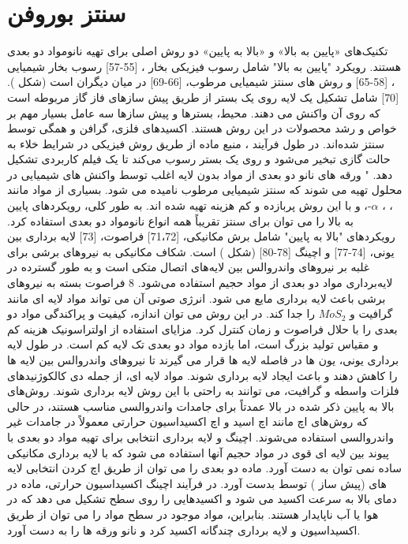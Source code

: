 \section{سنتز بوروفن}
تکنیک‌های «پایین به بالا» و «بالا به پایین» دو روش اصلی برای تهیه نانومواد دو بعدی هستند. رویکرد "پایین به بالا" شامل رسوب فیزیکی بخار ، [55-57] رسوب بخار شیمیایی ، [58-65] و روش های سنتز شیمیایی مرطوب، [66-69] در میان دیگران است (شکل ). [70]  شامل تشکیل یک لایه روی یک بستر از طریق پیش سازهای فاز گاز مربوطه است که روی آن واکنش می دهند. محیط، بسترها و پیش سازها سه عامل بسیار مهم بر خواص و رشد محصولات در این روش هستند. اکسیدهای فلزی، گرافن و  همگی توسط  سنتز شده‌اند. در طول فرآیند ، منبع ماده از طریق روش فیزیکی در شرایط خلاء به حالت گازی تبخیر می‌شود و روی یک بستر رسوب می‌کند تا یک فیلم کاربردی تشکیل دهد. "
ورقه های نانو دو بعدی از مواد بدون لایه اغلب توسط واکنش های شیمیایی در محلول تهیه می شوند که سنتز شیمیایی مرطوب نامیده می شود. بسیاری از مواد مانند ، ، $\alpha$-،  و  با این روش پربازده و کم هزینه تهیه شده اند. به طور کلی، رویکردهای پایین به بالا را می توان برای سنتز تقریباً همه انواع نانومواد دو بعدی استفاده کرد. رویکردهای "بالا به پایین" شامل برش مکانیکی، [71،72] فراصوت، [73] لایه برداری بین یونی، [74-77] و اچینگ [78-80] (شکل ) است. شکاف مکانیکی به نیروهای برشی برای غلبه بر نیروهای واندروالس بین لایه‌های اتصال متکی است و به طور گسترده در لایه‌برداری مواد دو بعدی از مواد حجیم استفاده می‌شود. 8
فراصوت بسته به نیروهای برشی باعث لایه برداری مایع می شود. انرژی صوتی آن می تواند مواد لایه ای مانند گرافیت و $MoS_2$ را جدا کند. در این روش می توان اندازه، کیفیت و پراکندگی مواد دو بعدی را با حلال فراصوت و زمان کنترل کرد. مزایای استفاده از اولتراسونیک هزینه کم و مقیاس تولید بزرگ است، اما بازده مواد دو بعدی تک لایه کم است. در طول لایه برداری یونی، یون ها در فاصله لایه ها قرار می گیرند تا نیروهای واندروالس بین لایه ها را کاهش دهند و باعث ایجاد لایه برداری شوند. مواد لایه ای، از جمله دی کالکوژنیدهای فلزات واسطه  و گرافیت، می توانند به راحتی با این روش لایه برداری شوند. روش‌های بالا به پایین ذکر شده در بالا عمدتاً برای جامدات واندروالسی مناسب هستند، در حالی که روش‌های اچ مانند اچ اسید و اچ اکسیداسیون حرارتی معمولاً در جامدات غیر واندروالسی استفاده می‌شوند. اچینگ و لایه برداری انتخابی برای تهیه مواد دو بعدی با پیوند بین لایه ای قوی در مواد حجیم آنها استفاده می شود که با لایه برداری مکانیکی ساده نمی توان به دست آورد. ماده دو بعدی  را می توان از طریق اچ کردن انتخابی لایه های  (پیش ساز ) توسط  بدست آورد. در فرآیند اچینگ اکسیداسیون حرارتی، ماده در دمای بالا به سرعت اکسید می شود و اکسیدهایی را روی سطح تشکیل می دهد که در هوا یا آب ناپایدار هستند. بنابراین، مواد موجود در سطح مواد را می توان از طریق اکسیداسیون و لایه برداری چندگانه اکسید کرد و نانو ورقه ها را به دست آورد.
